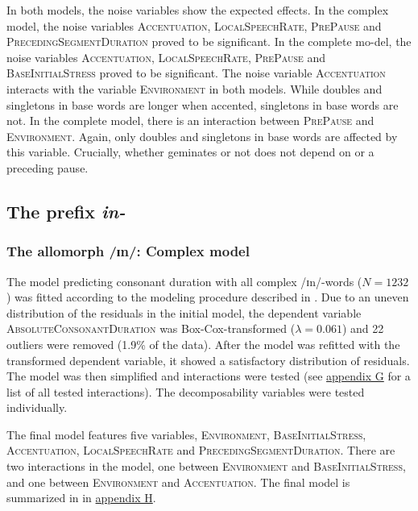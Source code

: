  In both models, the noise variables show the expected effects. In the complex model, the noise variables \textsc{Accentuation}, \textsc{LocalSpeechRate}, \textsc{PrePause} and \textsc{PrecedingSegmentDuration} proved to be significant. In the complete mo-del, the noise variables \textsc{Accentuation}, \textsc{LocalSpeechRate}, \textsc{PrePause} and \textsc{BaseInitialStress} proved to be significant.
 The noise variable \textsc{Accentuation} interacts with the variable \textsc{Environment} in both models. While doubles and singletons in base words are longer when accented, singletons in base words are not. In the complete model, there is an interaction between \textsc{PrePause} and \textsc{Environment}. Again, only doubles and singletons in base words are affected by this variable. Crucially,  whether  geminates or not does not depend on  or a preceding pause. 


\subsection{The prefix \textit{in-}} \label{in experiment}

\subsubsection{The allomorph /ɪn/: Complex model}

The model predicting consonant duration with all complex /ɪn/-words ($N=1232$) was fitted according to the modeling procedure described in . Due to an uneven distribution of the residuals in the initial model, the dependent variable \textsc{AbsoluteConsonantDuration} was Box-Cox-transformed ($\lambda = 0.061$) and 22 outliers were removed (1.9\% of the data).
After the model was refitted with the transformed dependent variable, it showed a satisfactory distribution of residuals.  The model was then simplified and interactions were tested (see \hyperref[Appendix G Summaries of tested interactions in experimental study]{appendix G} for a list of all tested interactions).
The decomposability variables were tested individually.

The final model features five variables, \textsc{Environment}, \textsc{BaseInitialStress}, \textsc{Accentuation}, \textsc{LocalSpeechRate} and \textsc{PrecedingSegmentDuration}. 
There are two interactions in the model, one between \textsc{Environment} and \textsc{BaseInitialStress}, and one between \textsc{Environment} and \textsc{Accentuation}. The final model is summarized in  in \hyperref[Appendix H: Model Summaries Experiment]{appendix H}.


